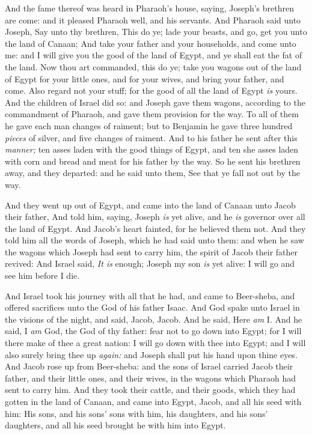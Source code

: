 \documentclass[11pt,letterpaper,oneside]{memoir}
\begin{document}
And the fame thereof was heard in Pharaoh's house, saying, Joseph's
brethren are come: and it pleased Pharaoh well, and his servants. And
Pharaoh said unto Joseph, Say unto thy brethren, This do ye; lade your
beasts, and go, get you unto the land of Canaan; And take your father
and your households, and come unto me: and I will give you the good of
the land of Egypt, and ye shall eat the fat of the land. Now thou art
commanded, this do ye; take you wagons out of the land of Egypt for your
little ones, and for your wives, and bring your father, and come. Also
regard not your stuff; for the good of all the land of Egypt \emph{is}
yours. And the children of Israel did so: and Joseph gave them wagons,
according to the commandment of Pharaoh, and gave them provision for the
way. To all of them he gave each man changes of raiment; but to Benjamin
he gave three hundred \emph{pieces} of silver, and five changes of
raiment. And to his father he sent after this \emph{manner;} ten asses
laden with the good things of Egypt, and ten she asses laden with corn
and bread and meat for his father by the way. So he sent his brethren
away, and they departed: and he said unto them, See that ye fall not out
by the way.

And they went up out of Egypt, and came into the land of Canaan unto
Jacob their father, And told him, saying, Joseph \emph{is} yet alive,
and he \emph{is} governor over all the land of Egypt. And Jacob's heart
fainted, for he believed them not. And they told him all the words of
Joseph, which he had said unto them: and when he saw the wagons which
Joseph had sent to carry him, the spirit of Jacob their father revived:
And Israel said, \emph{It is} enough; Joseph my son \emph{is} yet alive:
I will go and see him before I die.

And Israel took his journey with all that he had, and came to
Beer-sheba, and offered sacrifices unto the God of his father Isaac. And
God spake unto Israel in the visions of the night, and said, Jacob,
Jacob. And he said, Here \emph{am} I. And he said, I \emph{am} God, the
God of thy father: fear not to go down into Egypt; for I will there make
of thee a great nation: I will go down with thee into Egypt; and I will
also surely bring thee up \emph{again:} and Joseph shall put his hand
upon thine eyes. And Jacob rose up from Beer-sheba: and the sons of
Israel carried Jacob their father, and their little ones, and their
wives, in the wagons which Pharaoh had sent to carry him. And they took
their cattle, and their goods, which they had gotten in the land of
Canaan, and came into Egypt, Jacob, and all his seed with him: His sons,
and his sons' sons with him, his daughters, and his sons' daughters, and
all his seed brought he with him into Egypt.
\end{document}
